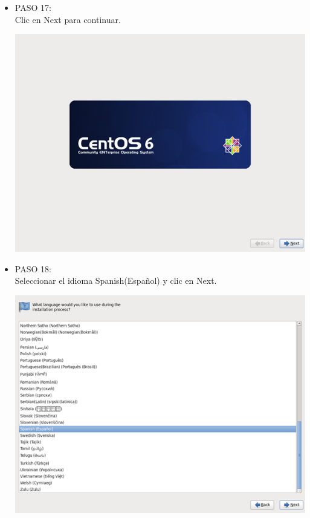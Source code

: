 \begin{itemize}
\item PASO 17:
\\Clic en Next para continuar.
		\begin{center}
		\includegraphics[width=13cm]{./Imagenes/17}
		\end{center}
	
	\end{itemize} 

\begin{itemize}
\item PASO 18:
\\Seleccionar el idioma Spanish(Español) y clic en Next.
		\begin{center}
		\includegraphics[width=13cm]{./Imagenes/18}
		\end{center}
	\\\
	\end{itemize} 

